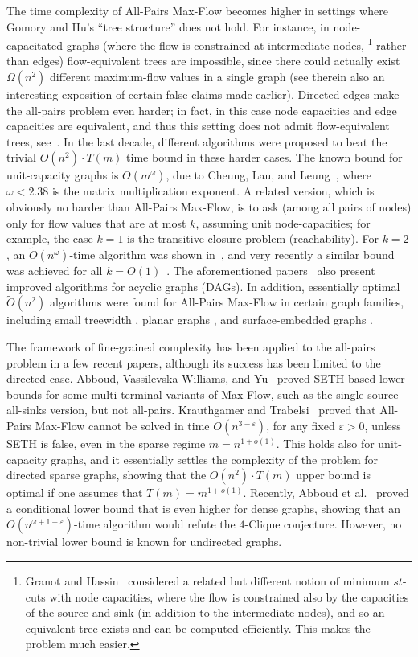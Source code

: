 \documentclass[11pt]{article}
\numberwithin{equation}{section}
\theoremstyle{definition}
\theoremstyle{plain}
\theoremstyle{plain}
\newcommand{\ProblemName}[1]{\textsf{#1}}
\newcommand{\MF}{\ProblemName{Max-Flow}\xspace}
\newcommand{\SETH}{SETH\xspace}
\newcommand{\APMF}{\ProblemName{All-Pairs Max-Flow}\xspace}
\newcommand\eps{\varepsilon}
\newcommand\tO{\ensuremath{\widetilde O}}  %
\begin{document}
The time complexity of \APMF becomes higher in settings
where Gomory and Hu's ``tree structure'' \cite{GH61} does not hold.
For instance, in node-capacitated graphs
(where the flow is constrained at intermediate nodes,%
\footnote{Granot and Hassin~\cite{GH86} considered
  a related but different notion of minimum $st$-cuts with node capacities,
  where the flow is constrained also by the capacities of the source and sink (in addition to
the  %
intermediate nodes), and so an equivalent tree exists and can be computed efficiently.
%
%
%
%
  This makes the problem much easier.
}
rather than edges) flow-equivalent trees are impossible,
since there could actually exist $\Omega(n^2)$ different maximum-flow values
in a single graph \cite{HL07} (see therein
also an interesting exposition of certain false claims made earlier).
Directed edges make the all-pairs problem even harder;
in fact, in this case node capacities and edge capacities are equivalent,
and thus this setting does not admit flow-equivalent trees,
see~\cite{Mayeda62,Jelinek63,HL07}.
In the last decade, different algorithms were proposed to beat the trivial $O(n^2)\cdot T(m)$ time bound in these harder cases.
The known bound for
%
unit-capacity graphs
is $O(m^\omega)$, due to Cheung, Lau, and Leung~\cite{CLL13},
where $\omega<2.38$ is the matrix multiplication exponent.
A related version, which is obviously no harder than \APMF,
is to ask (among all pairs of nodes) only for flow values that are at most $k$,
assuming unit node-capacities;
for example, the case $k=1$ is the transitive closure problem (reachability).
For $k=2$, an $\tO(n^\omega)$-time algorithm was shown in~\cite{G+17},
and very recently a similar bound was achieved for all $k=O(1)$~\cite{A+18}.
The aforementioned papers~\cite{CLL13,G+17,A+18}
also present improved algorithms for acyclic graphs (DAGs).
In addition, essentially optimal %
${\tO}(n^2)$    %
algorithms were found for \APMF in certain graph families,
including small treewidth \cite{ACZ98},
planar graphs \cite{LNSW12}, and
surface-embedded graphs \cite{BENW16}.


The framework of fine-grained complexity has been applied to the all-pairs problem in a few recent papers, although its success has been limited to the directed case.
Abboud, Vassilevska-Williams, and Yu~\cite{AVY15} proved \SETH-based lower bounds for some multi-terminal variants of \MF,
such as the single-source all-sinks version, but not all-pairs.
Krauthgamer and Trabelsi~\cite{KT18} proved that \APMF cannot be solved
in time $O(n^{3-\eps})$, for any fixed $\eps>0$, unless \SETH is false,
even in the sparse regime $m = n^{1+o(1)}$.
This holds also for unit-capacity graphs, and it essentially settles the complexity of the problem for directed sparse graphs, showing that the $O(n^2 )\cdot T(m)$ upper bound is optimal if one assumes that $T(m) = m^{1+o(1)}$.
Recently, Abboud et al.~\cite{A+18} proved a conditional lower bound that
is even higher for dense graphs,
showing that an $O(n^{\omega+1-\eps})$-time algorithm
would refute the $4$-Clique conjecture.
However, no non-trivial lower bound is known for undirected graphs.
\end{document}
